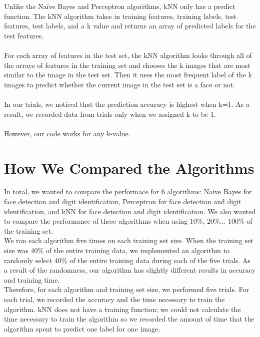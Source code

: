 \documentclass{article}
\begin{document}
Unlike the Naïve Bayes and Perceptron algorithms, kNN only has a predict function. The kNN algorithm takes in training features, training labels, test features, test labels, and a k value and returns an array of predicted labels for the test features. \\\\
For each array of features in the test set, the kNN algorithm looks through all of the arrays of features in the training set and chooses the k images that are most similar to the image in the test set. Then it uses the most frequent label of the k images to predict whether the current image in the test set is a face or not. \\\\
In our trials, we noticed that the prediction accuracy is highest when k=1. As a result, we recorded data from trials only when we assigned k to be 1.\\\\
However, our code works for any k-value. 


\section{How We Compared the Algorithms}
In total, we wanted to compare the performace for 6 algorithms: Naive Bayes for face detection and digit identification, Perceptron for face detection and digit identification, and kNN for face detection and digit identification. We also wanted to compare the performance of these algorithms when using 10\%, 20\%... 100\% of the training set. \\

We ran each algorithm five times on each training set size. When the training set size was 40\% of the entire training data, we implemented an algorithm to randomly select 40\% of the entire training data during each of the five trials. As a result of the randomness, our algorithm has slightly different results in accuracy and training time.\\

Therefore, for each algorithm and training set size, we performed five trials. For each trial, we recorded the accuracy and the time necessary to train the algorithm. kNN does not have a training function; we could not calculate the time necessary to train the algorithm so we recorded the amount of time that the algorithm spent to predict one label for one image. \\
\end{document}
